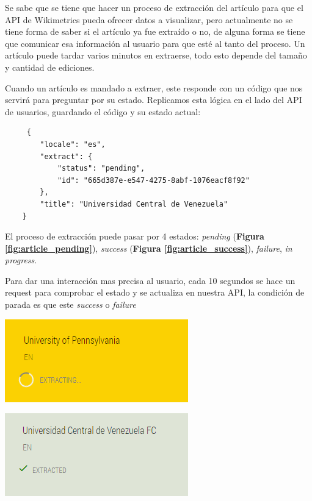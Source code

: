 \begin{enumerate}
  Se sabe que se tiene que hacer un proceso de extracción del artículo para que el API de Wikimetrics pueda ofrecer datos a visualizar, pero actualmente no se tiene forma de saber si el artículo ya fue extraído o no, de alguna forma se tiene que comunicar esa información al usuario para que esté al tanto del proceso. Un artículo puede tardar varios minutos en extraerse, todo esto depende del tamaño y cantidad de ediciones.
 
  Cuando un artículo es mandado a extraer, este responde con un código que nos servirá para preguntar por su estado. Replicamos esta lógica en el lado del API de usuarios, guardando el código y su estado actual:
  \begin{verbatim}
     {
        "locale": "es",
        "extract": {
            "status": "pending",
            "id": "665d387e-e547-4275-8abf-1076eacf8f92"
        },
        "title": "Universidad Central de Venezuela"
    }
  \end{verbatim}
  
  El proceso de extracción puede pasar por 4 estados: \textit{pending} (\textbf{Figura \ref{fig:article_pending}}), \textit{success} (\textbf{Figura \ref{fig:article_success}}), \textit{failure}, \textit{in progress}.
  
  Para dar una interacción mas precisa al usuario, cada 10 segundos se hace un request para comprobar el estado y se actualiza en nuestra API, la condición de parada es que este \textit{success} o \textit{failure}
  
  \begin{center}
      \bigbreak
      \includegraphics{images/marco_aplicativo/article_pending.png}
      \label{fig:article_pending}
      \bigbreak
  \end{center}
  \begin{center}
      \bigbreak
      \includegraphics{images/marco_aplicativo/article_extracted.png}
      \label{fig:article_success}
      \bigbreak
  \end{center} 
  

\end{enumerate}

